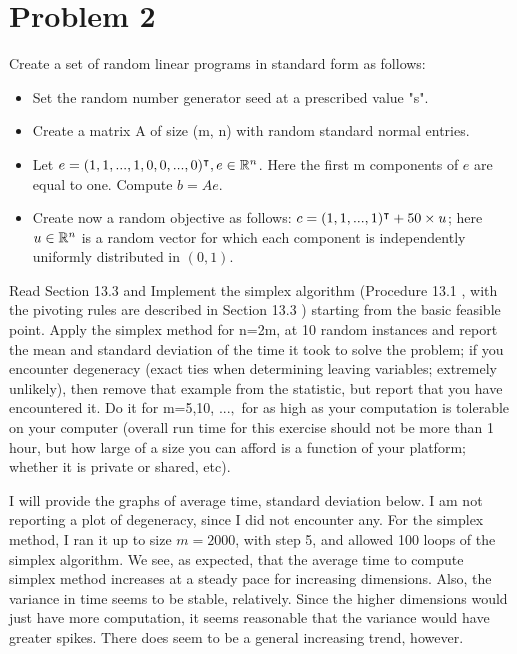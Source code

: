\newpage
\section{Problem 2}
Create a set of random linear programs in standard form as follows:
\begin{itemize}
    \item Set the random number generator seed at a prescribed value "s".
    \item Create a matrix A of size (m, n) with random standard normal entries.
    \item Let $e = (1, 1, ..., 1, 0, 0, ..., 0)^{\intercal} , e \in \mathbb{R}^n$. Here the first m components of $e$ are equal to one. Compute $b = Ae$.
    \item Create now a random objective as follows: $c = (1, 1, ..., 1)^{\intercal} + 50 \times u$; here $u\in \mathbb{R}^n$ is a random vector for which each component is independently uniformly distributed in $(0, 1)$.
\end{itemize}
Read Section 13.3 and Implement the simplex algorithm (Procedure 13.1 , with the pivoting rules are described in Section 13.3 ) starting from the basic feasible point. Apply the simplex method for n=2m, at 10 random instances and report the mean and standard deviation of the time it took to solve the problem; if you encounter degeneracy (exact ties when determining leaving variables; extremely unlikely), then remove that example from the statistic, but report that you have encountered it. Do it for m=5,10, $..., $ for as high as your computation is tolerable on your computer (overall run time for this exercise should not be more than 1 hour, but how large of a size you can afford is a function of your platform; whether it is private or shared, etc).
\partbreak
\begin{solution}

    I will provide the graphs of average time, standard deviation below. I am not reporting a plot of degeneracy, since I did not encounter any. For the simplex method, I ran it up to size $m = 2000$, with step 5, and allowed 100 loops of the simplex algorithm. We see, as expected, that the average time to compute simplex method increases at a steady pace for increasing dimensions. Also, the variance in time seems to be stable, relatively. Since the higher dimensions would just have more computation, it seems reasonable that the variance would have greater spikes. There does seem to be a general increasing trend, however. 
\end{solution}


